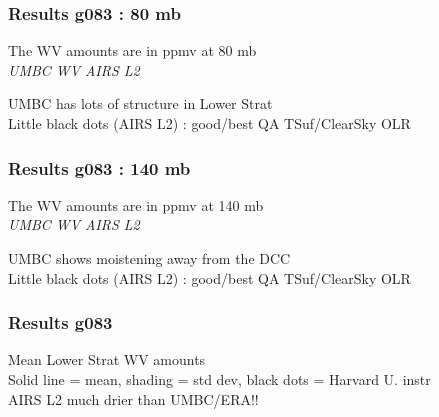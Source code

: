 \documentclass[10pt,t]{beamer}
\begin{document}
\begin{frame}
\frametitle{Results g083 : 80 mb}
The WV amounts are in ppmv at 80 mb\\
\hspace{0.5in} \emph{UMBC WV}  \hspace{2.0in} \emph{AIRS L2} \\
\begin{center}
\end{center}
UMBC has lots of structure in Lower Strat \\
Little black dots (AIRS L2) : good/best QA TSuf/ClearSky OLR
\end{frame}

\begin{frame}
\frametitle{Results g083 : 140 mb}
The WV amounts are in ppmv at 140 mb\\
\hspace{0.5in} \emph{UMBC WV}  \hspace{2.0in} \emph{AIRS L2} \\
\begin{center}
\end{center}
UMBC shows moistening away from the DCC \\
Little black dots (AIRS L2) : good/best QA TSuf/ClearSky OLR
\end{frame}

\begin{frame}
\frametitle{Results g083}
Mean Lower Strat WV amounts \\
Solid line = mean, shading = std dev, black dots = Harvard U. instr\\
AIRS L2 much drier than UMBC/ERA!!
\end{frame}
\end{document}
